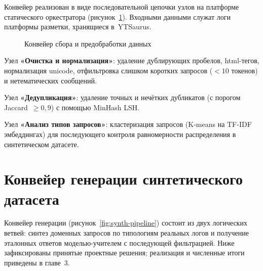 \documentclass[times]{itmo-student-thesis}
\begin{document}
Конвейер реализован в виде последовательной цепочки узлов
на платформе статического оркестратора (рисунок~\ref{fig:data-pipeline}).
Входными данными служат логи платформы разметки, хранящиеся в~YTSaurus.

\begin{figure}[h]
\caption{Конвейер сбора и предобработки данных}\label{fig:data-pipeline}
\centering
{}
\end{figure}

Узел \textbf{«Очистка и нормализация»}: удаление дублирующих пробелов,
html-тегов, нормализация unicode, отфильтровка слишком коротких
запросов ($<10$ токенов) и нетематических сообщений.

Узел \textbf{«Дедупликация»}: удаление точных и нечётких дубликатов
(с порогом Jaccard~$\ge 0{,}9$) с помощью MinHash LSH.

Узел \textbf{«Анализ типов запросов»}: кластеризация запросов (K-means
на TF-IDF эмбеддингах) для последующего контроля равномерности
распределения в синтетическом датасете.

\section{Конвейер генерации синтетического датасета}\label{sec:synth-design}

Конвейер генерации (рисунок~\ref{fig:synth-pipeline}) состоит из двух
логических ветвей: синтез доменных запросов по типологиям реальных логов
и получение эталонных ответов моделью-учителем с последующей фильтрацией.
Ниже зафиксированы принятые проектные решения; реализация и численные
итоги приведены в главе~3.
\end{document}
